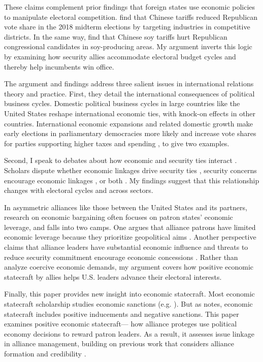 \documentclass[12pt]{article}
\begin{document}
These claims complement prior findings that foreign states use economic policies to manipulate electoral competition. 
\citet{KimMargalit2021} find that Chinese tariffs reduced Republican vote share in the 2018 midterm elections by targeting industries in competitive districts.
In the same way, \cite{ChyzhUrbatsch2021} find that Chinese soy tariffs hurt Republican congressional candidates in soy-producing areas. 
My argument inverts this logic by examining how security allies accommodate electoral budget cycles and thereby help incumbents win office. 


The argument and findings address three salient issues in international relations theory and practice. 
First, they detail the international consequences of political business cycles. 
Domestic political business cycles in large countries like the United States reshape international economic ties, with knock-on effects in other countries.
International economic expansions and related domestic growth make early elections in parliamentary democracies more likely \citep{Kayser2006} and increase vote shares for parties supporting higher taxes and spending \citep{Kayser2009}, to give two examples.


Second, I speak to debates about how economic and security ties interact \citep{Mastanduno2009, Poast2019}. 
Scholars dispute whether economic linkages drive security ties \citep{BiglaiserDeRouen2007, Fordham2010, Kimball2010}, security concerns encourage economic linkages \citep{Gowa1995, Li2003, LongLeeds2006, GowaMansfield2004}, or both \citep{BiglaiserDeRouen2009, KinneBunte2018}. 
My findings suggest that this relationship changes with electoral cycles and across sectors.


In asymmetric alliances like those between the United States and its partners, research on economic bargaining often focuses on patron states' economic leverage, and falls into two camps. 
One argues that alliance patrons have limited economic leverage because they prioritize geopolitical aims \citep{Drezner2013, WolfordKim2017}.
Another perspective claims that alliance leaders have substantial economic influence \citep{Norrlof2010, Brooksetal2013} and threats to reduce security commitment encourage economic concessions \citep[pg. 122]{Oatley2015}.
Rather than analyze coercive economic demands, my argument covers how positive economic statecraft by allies helps U.S. leaders advance their electoral interests.


Finally, this paper provides new insight into economic statecraft. 
Most economic statecraft scholarship studies economic sanctions (e.g. \cite{Marinov2005, Allen2008, Escriba-FolchWright2010}).
But as \citet{Baldwin2020} notes, economic statecraft includes positive inducements and negative sanctions. 
This paper examines positive economic statecraft--- how alliance proteges use political economy decisions to reward patron leaders.
As a result, it assesses issue linkage in alliance management, building on previous work that considers alliance formation \citep{Poast2012} and credibility \citep{Davis2008, Poast2013}. 
\end{document}
